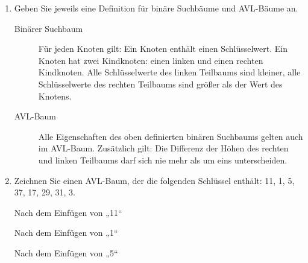 \documentclass{bschlangaul-aufgabe}
\begin{document}
\begin{enumerate}
\item Geben Sie jeweils eine Definition für binäre Suchbäume und
AVL-Bäume an.

\begin{bAntwort}

\begin{description}
\item[Binärer Suchbaum] Für jeden Knoten gilt: Ein Knoten enthält einen
Schlüsselwert. Ein Knoten hat zwei Kindknoten: einen linken und einen
rechten Kindknoten. Alle Schlüsselwerte des linken Teilbaums sind
kleiner, alle Schlüsselwerte des rechten Teilbaums sind größer als der
Wert des Knotens.

\item[AVL-Baum] Alle Eigenschaften des oben definierten binären
Suchbaums gelten auch im AVL-Baum. Zusätzlich gilt: Die Differenz der
Höhen des rechten und linken Teilbaums darf sich nie mehr als um eins
unterscheiden.
\end{description}

\end{bAntwort}

\item Zeichnen Sie einen AVL-Baum, der die folgenden Schlüssel enthält:
11, 1, 5, 37, 17, 29, 31, 3.

\begin{bAntwort}
\begin{bBaum}{Nach dem Einfügen von „11“}
\end{bBaum}

\begin{bBaum}{Nach dem Einfügen von „1“}
\end{bBaum}

\begin{bBaum}{Nach dem Einfügen von „5“}
\end{bBaum}


\end{bAntwort}
\end{enumerate}
\end{document}
